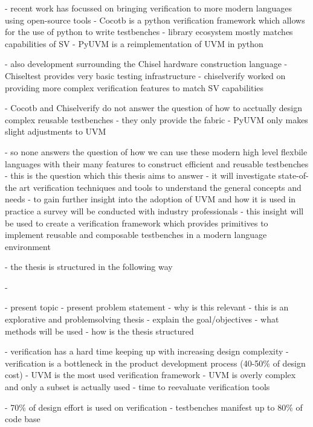 - recent work has focussed on bringing verification to more modern languages using open-source tools
- Cocotb is a python verification framework which allows for the use of python to write testbenches
- library ecosystem mostly matches capabilities of SV
- PyUVM is a reimplementation of UVM in python

- also development surrounding the Chisel hardware construction language
- Chiseltest provides very basic testing infrastructure
- chiselverify worked on providing more complex verification features to match SV capabilities

- Cocotb and Chiselverify do not answer the question of how to acctually design complex reusable testbenches
- they only provide the fabric
- PyUVM only makes slight adjustments to UVM

- so none answers the question of how we can use these modern high level flexbile languages with their many features to construct efficient and reusable testbenches
- this is the question which this thesis aims to answer
- it will investigate state-of-the art verification techniques and tools to understand the general concepts and needs
- to gain further insight into the adoption of UVM and how it is used in practice a survey will be conducted with industry professionals
- this insight will be used to create a verification framework which provides primitives to implement reusable and composable testbenches in a modern language environment

- the thesis is structured in the following way


- \cite{UVM12}


- present topic
- present problem statement
- why is this relevant
- this is an explorative and problemsolving thesis
- explain the goal/objectives
- what methods will be used
- how is the thesis structured

- verification has a hard time keeping up with increasing design complexity
- verification is a bottleneck in the product development process (40-50\% of design cost) \cite{mehta2018asic}
- UVM is the most used verification framework
- UVM is overly complex and only a subset is actually used \cite{sutherland2015uvm}
- time to reevaluate verification tools

- 70\% of design effort is used on verification \cite[Ch. 1]{bergeron2012writing}
- testbenches manifest up to 80\% of code base \cite[Ch. 1]{bergeron2012writing}

